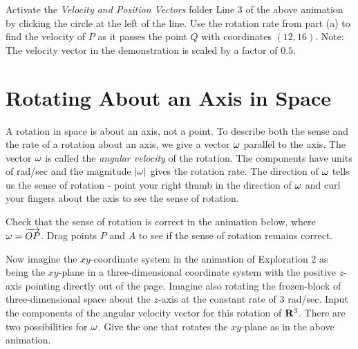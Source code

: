 \documentclass{ximera}
\begin{document}
\begin{exploration}
\begin{question}   \label{Q3456457l:Cross}
Activate the {\it Velocity and Position Vectors} folder Line 3 of the above animation by clicking the circle at the left of the line. Use the rotation rate from part (a) to find the velocity of $P$ as it passes the point $Q$ with coordinates $(12,16)$. Note: The velocity vector in the demonstration is scaled by a factor of $0.5$.
\end{question}

\end{exploration}



\section{Rotating About an Axis in Space}
A rotation in space is about an axis, not a point. To describe both the sense and the rate of a rotation about an axis, we give a vector ${\bf \omega}$ parallel to the axis. The vector ${\bf\omega}$ is called the \emph{angular velocity} of the rotation. The components have units of rad/sec and the magnitude $|{\bf \omega}|$ gives the rotation rate. The direction of ${\bf \omega}$ tells us the sense of rotation - point your right thumb in the direction of ${\bf \omega}$ and curl your fingers about the axis to see the sense of rotation.

Check that the sense of rotation is correct in the animation below, where ${\bf \omega} = \overrightarrow{OP}$. Drag points $P$ and $A$ to see if the sense of rotation remains correct.


 
\begin{onlineOnly}
    \begin{center}
\end{center}
\end{onlineOnly}





Now imagine the $xy$-coordinate system in the animation of Exploration 2 as being the $xy$-plane in a three-dimensional coordinate system with the positive $z$-axis pointing directly out of the page. Imagine also rotating the frozen-block of three-dimensional space about the $z$-axis at the constant rate of $3$ rad/sec. Input the components of the angular velocity vector for this rotation of ${\bf R}^3$. There are two possibilities for ${\bf \omega}$. Give the one that rotates the $xy$-plane as in the above animation. 
\end{document}
